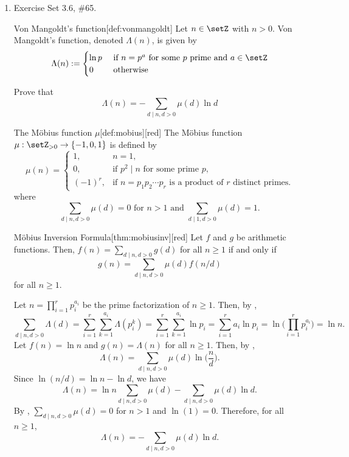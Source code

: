 \begin{enumerate}
  \item Exercise Set 3.6, \#65. 
  \begin{define}{Von Mangoldt's function}[def:vonmangoldt]
  Let $n \in \setZ$ with $n>0$. Von Mangoldt's function, denoted $\Lambda(n)$, is given by
  \[
  \Lambda(n):= \begin{cases}\ln p & \text { if } n=p^a \text { for some } p \text { prime and } a \in \setZ \\ 0 & \text { otherwise }\end{cases}
  \]
  \end{define}
  Prove that
  \[
  \Lambda(n)=-\sum_{d \mid n, d>0} \mu(d) \ln d
  \]
  \begin{define}{The Möbius function $\mu$}[def:mobius][red]
  The Möbius function $\mu:\setZ_{>0}\to\{-1,0,1\}$ is defined by
  \[
  \mu(n)=
  \begin{cases}
  1,& n=1,\\[4pt]
  0,&\text{if } p^2\mid n \text{ for some prime } p,\\[4pt]
  (-1)^r,&\text{if } n=p_1p_2\cdots p_r \text{ is a product of } r \text{ distinct primes.}
  \end{cases}
  \]
  where 
  \[
    \sum_{d \mid n, d>0} \mu(d) = 0 \text{ for } n>1 \text{ and } \sum_{d \mid 1, d>0} \mu(d) = 1.
  \]
  \end{define}
  \begin{define}{Möbius Inversion Formula}[thm:mobiusinv][red]
  Let $f$ and $g$ be arithmetic functions. Then, 
  $f(n)=\sum_{d\mid n, d>0} g(d)$ for all $n\ge 1$ if and only if
  \[
  g(n)=\sum_{d\mid n, d>0}\mu(d)f(n/d)
  \]
  for all $n\ge 1$.
  \end{define}
  \begin{subprove}
    Let \(n=\prod_{i=1}^r p_i^{a_i}\) be the prime factorization of \(n\ge1\).
    Then, by ,
    \[
      \sum_{d\mid n, d>0}\Lambda(d)
      =\sum_{i=1}^r\sum_{k=1}^{a_i}\Lambda(p_i^k)
      =\sum_{i=1}^r\sum_{k=1}^{a_i}\ln p_i
      =\sum_{i=1}^r a_i\ln p_i
      =\ln\!\bigg(\prod_{i=1}^r p_i^{a_i}\bigg)
      =\ln n.
    \]
    Let $f(n) = \ln n$ and $g(n) = \Lambda(n)$ for all \(n\ge1\). Then, by ,
    \[
      \Lambda(n)=\sum_{d\mid n, d>0}\mu(d)\ln\!\bigg(\frac{n}{d}\bigg).
    \]
    Since \(\ln(n/d)=\ln n-\ln d\), we have
    \[
      \Lambda(n)
      =\ln n\sum_{d\mid n, d>0}\mu(d)-\sum_{d\mid n, d>0}\mu(d)\ln d.
    \]
    By , \(\sum_{d\mid n, d>0}\mu(d)=0\) for \(n>1\) and 
    \(\ln(1)=0\). Therefore, for all \(n\ge1\),
    \[
      \Lambda(n)=-\sum_{d\mid n, d>0}\mu(d)\ln d.
    \]
  \end{subprove}



















\end{enumerate}
